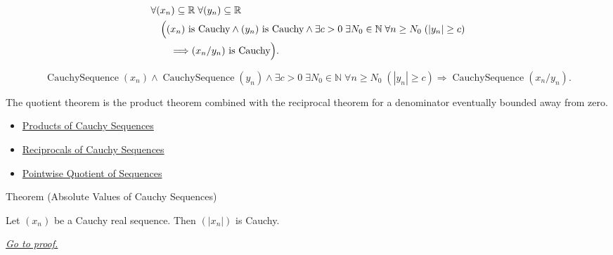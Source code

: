 \begin{remark*}
\[
\begin{aligned}
&\forall (x_n)\subseteq\mathbb{R}\;\forall (y_n)\subseteq\mathbb{R}\\
&\quad
\Bigl(
  (x_n)\text{ is Cauchy}
  \land
  (y_n)\text{ is Cauchy}
  \land
  \exists c>0\;\exists N_0\in\mathbb{N}\;\forall n\ge N_0\;( |y_n|\ge c )\\
&\qquad\Longrightarrow
  (x_n/y_n)\text{ is Cauchy}
\Bigr).
\end{aligned}
\]
\end{remark*}

\begin{remark*}
\[
\operatorname{CauchySequence}(x_n)
\land
\operatorname{CauchySequence}(y_n)
\land
\exists c>0\;\exists N_0\in\mathbb{N}\;\forall n\ge N_0\;( |y_n|\ge c )
\Longrightarrow
\operatorname{CauchySequence}(x_n/y_n).
\]
\end{remark*}

\begin{remark*}[Interpretation]
The quotient theorem is the product theorem combined with the reciprocal
theorem for a denominator eventually bounded away from zero.
\end{remark*}

\begin{dependencies}
\begin{itemize}
  \item \hyperref[thm:product-cauchy-sequences]{Products of Cauchy Sequences}
  \item \hyperref[thm:reciprocal-cauchy-sequence]{Reciprocals of Cauchy Sequences}
  \item \hyperref[def:pointwise-quotient-sequence]{Pointwise Quotient of Sequences}
\end{itemize}
\end{dependencies}


\begin{theorembox}{Theorem (Absolute Values of Cauchy Sequences)}
\begin{theorem}
\label{thm:absolute-value-cauchy-sequence}
Let $(x_n)$ be a Cauchy real sequence. Then $(|x_n|)$ is Cauchy.

\smallskip
\noindent
\hyperref[prf:absolute-value-cauchy-sequence]{\textit{Go to proof.}}
\end{theorem}
\end{theorembox}


